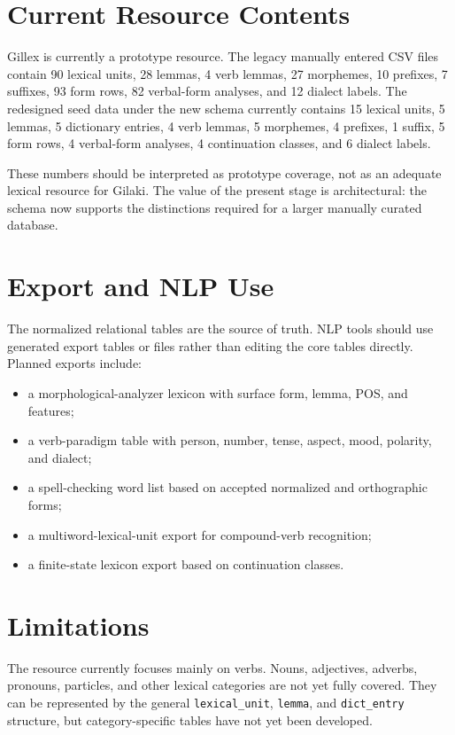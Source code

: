 \documentclass[11pt]{article}
\begin{document}
\section{Current Resource Contents}

Gillex is currently a prototype resource. The legacy manually entered CSV files contain 90 lexical units, 28 lemmas, 4 verb lemmas, 27 morphemes, 10 prefixes, 7 suffixes, 93 form rows, 82 verbal-form analyses, and 12 dialect labels. The redesigned seed data under the new schema currently contains 15 lexical units, 5 lemmas, 5 dictionary entries, 4 verb lemmas, 5 morphemes, 4 prefixes, 1 suffix, 5 form rows, 4 verbal-form analyses, 4 continuation classes, and 6 dialect labels.

These numbers should be interpreted as prototype coverage, not as an adequate lexical resource for Gilaki. The value of the present stage is architectural: the schema now supports the distinctions required for a larger manually curated database.

\section{Export and NLP Use}

The normalized relational tables are the source of truth. NLP tools should use generated export tables or files rather than editing the core tables directly. Planned exports include:
\begin{itemize}
    \item a morphological-analyzer lexicon with surface form, lemma, POS, and features;
    \item a verb-paradigm table with person, number, tense, aspect, mood, polarity, and dialect;
    \item a spell-checking word list based on accepted normalized and orthographic forms;
    \item a multiword-lexical-unit export for compound-verb recognition;
    \item a finite-state lexicon export based on continuation classes.
\end{itemize}

\section{Limitations}

The resource currently focuses mainly on verbs. Nouns, adjectives, adverbs, pronouns, particles, and other lexical categories are not yet fully covered. They can be represented by the general \texttt{lexical\_unit}, \texttt{lemma}, and \texttt{dict\_entry} structure, but category-specific tables have not yet been developed.
\end{document}
